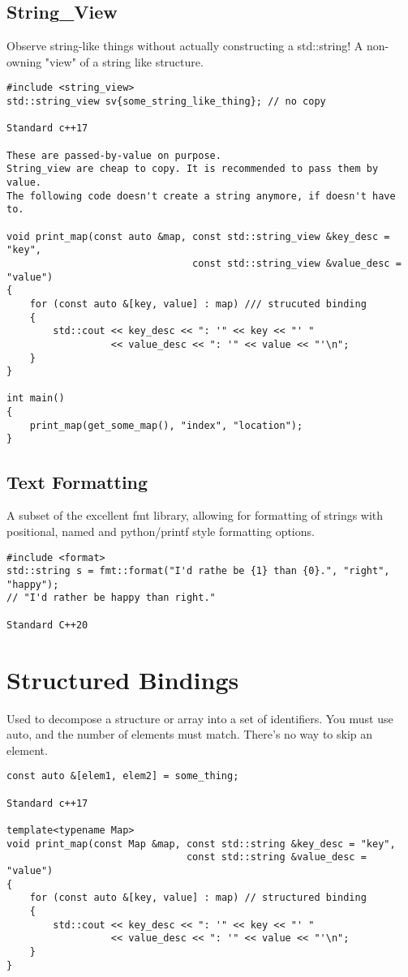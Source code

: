 \subsection{String\_View}

Observe string-like things without actually constructing a std::string!
A non-owning "view" of a string like structure.

\begin{verbatim}
#include <string_view>
std::string_view sv{some_string_like_thing}; // no copy

Standard c++17

These are passed-by-value on purpose.
String_view are cheap to copy. It is recommended to pass them by value.
The following code doesn't create a string anymore, if doesn't have to.

void print_map(const auto &map, const std::string_view &key_desc = "key",
                                const std::string_view &value_desc = "value")
{
    for (const auto &[key, value] : map) /// strucuted binding
    {
        std::cout << key_desc << ": '" << key << "' "
                  << value_desc << ": '" << value << "'\n";
    }
}

int main()
{
    print_map(get_some_map(), "index", "location");
}
\end{verbatim}

\subsection{Text Formatting}

A subset of the excellent {fmt} library, allowing for formatting of strings with positional,
named and python/printf style formatting options.

\begin{verbatim}
#include <format>
std::string s = fmt::format("I'd rathe be {1} than {0}.", "right", "happy");
// "I'd rather be happy than right."

Standard C++20
\end{verbatim}

\section{Structured Bindings}

Used to decompose a structure or array into a set of identifiers.
You must use auto, and the number of elements must match. There's no way to skip an element.

\begin{verbatim}
const auto &[elem1, elem2] = some_thing;

Standard c++17

template<typename Map>
void print_map(const Map &map, const std::string &key_desc = "key",
                               const std::string &value_desc = "value")
{
    for (const auto &[key, value] : map) // structured binding
    {
        std::cout << key_desc << ": '" << key << "' "
                  << value_desc << ": '" << value << "'\n";
    }
}
\end{verbatim}

